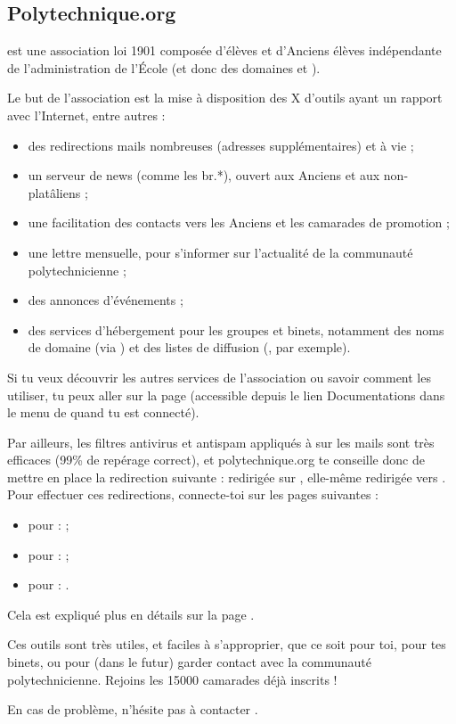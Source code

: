 \subsection{Polytechnique.org}
 est une association loi 1901 composée d'élèves et d'Anciens élèves
 indépendante de l'administration de l'École (et donc des domaines 
 et ).

Le but de l'association est la mise à disposition des X d'outils
ayant un rapport avec l'Internet, entre autres :
\begin{itemize}
  \item des redirections mails nombreuses (adresses supplémentaires) et à vie ;
  \item un serveur de news (comme les br.*), ouvert aux Anciens et aux non-platâliens ;
  \item une facilitation des contacts vers les Anciens et les camarades de promotion ;
  \item une lettre mensuelle, pour s'informer sur l'actualité de la communauté polytechnicienne ;
  \item des annonces d'événements ;
  \item des services d'hébergement pour les groupes et binets, notamment des noms de domaine (via ) et des listes de diffusion (, par exemple).
\end{itemize}
Si tu veux découvrir les autres services de l'association ou savoir
comment les utiliser, tu peux aller sur la page
 (accessible depuis
le lien Documentations dans le menu de 
quand tu est connecté).

Par ailleurs, les filtres antivirus et antispam appliqués à sur les mails sont très efficaces (99\% de repérage correct), et polytechnique.org te conseille donc de mettre en place la redirection suivante :
redirigée sur ,
elle-même redirigée vers .
Pour effectuer ces redirections, connecte-toi sur les pages suivantes :
\begin{itemize}
  \item pour  :  ;
  \item pour  :  ;
  \item pour  : .
\end{itemize}
Cela est expliqué plus en détails sur la page
.

Ces outils sont très utiles, et faciles à s'approprier, que
ce soit pour toi, pour tes binets, ou pour (dans le
futur) garder contact avec la communauté polytechnicienne. Rejoins
les 15000 camarades déjà inscrits !

En cas de problème, n'hésite pas à contacter
.

